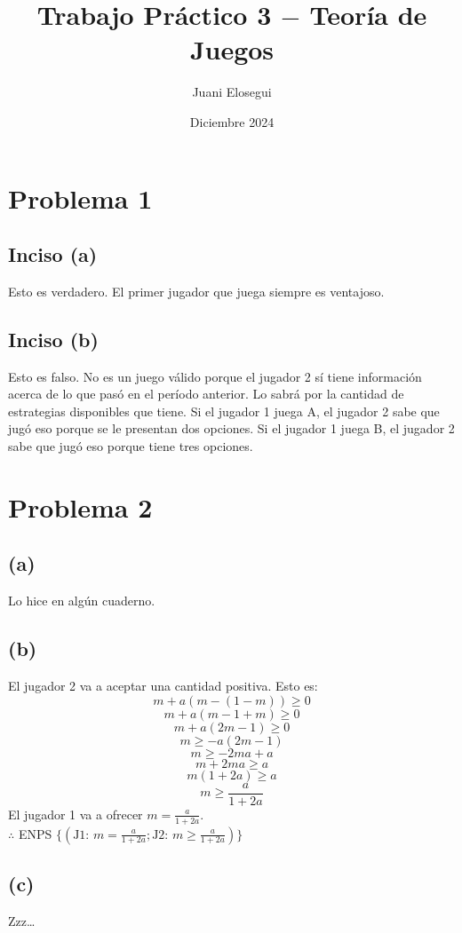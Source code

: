 \documentclass{article}
\title{Trabajo Práctico 3 $-$ Teoría de Juegos}
\author{Juani Elosegui}
\date{Diciembre 2024}
\begin{document}
    \maketitle
    
    \section*{Problema 1}
        \subsection*{Inciso (a)}
            Esto es verdadero. El primer jugador que juega siempre es ventajoso.
        \subsection*{Inciso (b)}
            Esto es falso. No es un juego válido porque el jugador 2 sí tiene información acerca de lo que pasó en el período anterior. Lo sabrá por la cantidad de estrategias disponibles que tiene. Si el jugador 1 juega A, el jugador 2 sabe que jugó eso porque se le presentan dos opciones. Si el jugador 1 juega B, el jugador 2 sabe que jugó eso porque tiene tres opciones.
    \section*{Problema 2}
        \subsection*{(a)}   
            Lo hice en algún cuaderno.
        \subsection*{(b)}
            El jugador 2 va a aceptar una cantidad positiva. Esto es: \\
            \[m + a(m-(1-m)) \geq 0\]
            \[m + a(m-1+m) \geq 0\]
            \[m + a(2m-1) \geq 0\]
            \[m \geq -a(2m-1)\]
            \[m \geq -2ma+a\]
            \[m+2ma \geq a\]
            \[m(1+2a) \geq a\]
            \[m \geq \frac{a}{1+2a}\]
            El jugador 1 va a ofrecer \(m =\frac{a}{1+2a}\). \\
            $\therefore$ ENPS \(\{(\text{J1: }m =\frac{a}{1+2a}; \text{J2: }m \geq \frac{a}{1+2a})\}\)
        \subsection*{(c)}
            Zzz\dots
\end{document}
